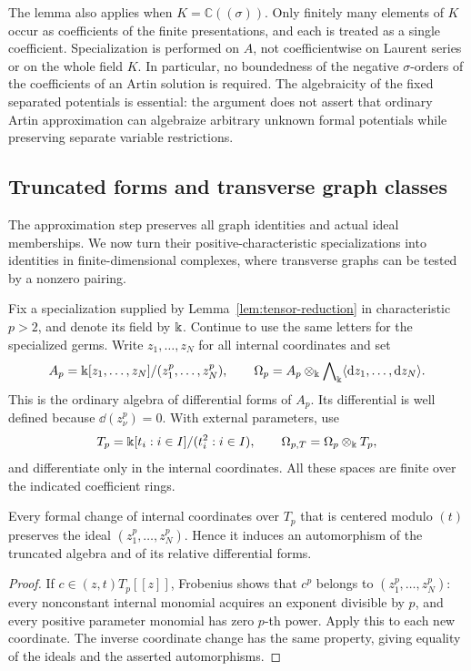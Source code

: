 \begin{remark}\label{rem:tensor-coefficient-field}
The lemma also applies when \(K=\mathbb C((\sigma))\).
Only finitely many elements of \(K\) occur as coefficients of the finite
presentations, and each is treated as a single coefficient.
Specialization is performed on \(A\), not coefficientwise on Laurent
series or on the whole field \(K\).
In particular, no boundedness of the negative \(\sigma\)-orders of the
coefficients of an Artin solution is required.
The algebraicity of the fixed separated potentials is essential:
the argument does not assert that ordinary Artin approximation can
algebraize arbitrary unknown formal potentials while preserving separate
variable restrictions.
\end{remark}

\subsection{Truncated forms and transverse graph classes}

The approximation step preserves all graph identities and actual ideal
memberships. We now turn their positive-characteristic specializations
into identities in finite-dimensional complexes, where transverse
graphs can be tested by a nonzero pairing.

Fix a specialization supplied by Lemma~\ref{lem:tensor-reduction} in
characteristic \(p>2\), and denote its field by \(\Bbbk\).
Continue to use the same letters for the specialized germs.
Write \(z_1,\ldots,z_N\) for all internal coordinates and set
\[
 A_p=\Bbbk[z_1,\ldots,z_N]/(z_1^p,\ldots,z_N^p),\qquad
 \Omega_p=A_p\otimes_\Bbbk\bigwedge\nolimits_\Bbbk
                   \langle \mathrm{d} z_1,\ldots,\mathrm{d} z_N\rangle .
\]
This is the ordinary algebra of differential forms of \(A_p\).
Its differential is well defined because \(\dd(z_\nu^p)=0\).
With external parameters, use
\[
 T_p=\Bbbk[t_i:i\in I]/(t_i^2:i\in I),
 \qquad \Omega_{p,T}=\Omega_p\otimes_\Bbbk T_p,
\]
and differentiate only in the internal coordinates.
All these spaces are finite over the indicated coefficient rings.

\begin{lemma}\label{lem:tensor-frobenius}
Every formal change of internal coordinates over \(T_p\) that is centered
modulo \((t)\) preserves the ideal
\((z_1^p,\ldots,z_N^p)\).  Hence it induces an automorphism of the truncated
algebra and of its relative differential forms.
\end{lemma}

\begin{proof}
If \(c\in(z,t)T_p[[z]]\), Frobenius shows that \(c^p\) belongs to
\((z_1^p,\ldots,z_N^p)\): every nonconstant internal monomial acquires an
exponent divisible by \(p\), and every positive parameter monomial has
zero \(p\)-th power.  Apply this to each new coordinate.
The inverse coordinate change has the same property, giving equality of
the ideals and the asserted automorphisms.
\end{proof}


